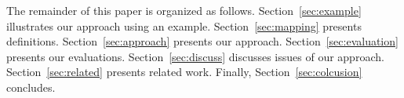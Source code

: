 The remainder of this paper is organized as follows. Section~\ref{sec:example}
illustrates our approach using an example. Section~\ref{sec:mapping}
presents definitions. Section~\ref{sec:approach} presents our
approach. Section~\ref{sec:evaluation} presents our evaluations.
Section~\ref{sec:discuss} discusses issues of our approach.
Section~\ref{sec:related} presents related work. Finally,
Section~\ref{sec:colcusion} concludes.
